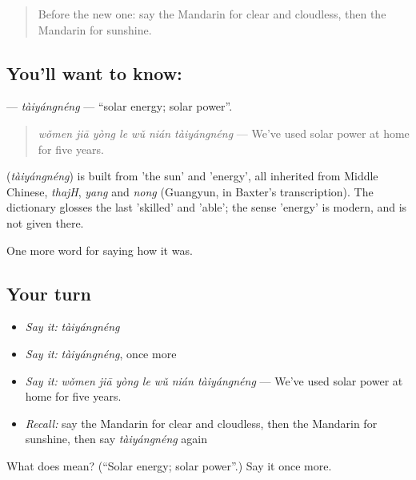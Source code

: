 \label{lesson:ZH-C518-taiyangneng}



\begin{quote}
Before the new one: say the Mandarin for clear and cloudless, then the Mandarin for sunshine.
\end{quote}

\subsection*{You'll want to know: }
\textbf{} — \emph{tàiyángnéng} — \textquotedblleft{}solar energy; solar power\textquotedblright{}.

\begin{quote}
\textbf{} \emph{wǒmen jiā yòng le wǔ nián tàiyángnéng} — We've used solar power at home for five years.
\end{quote}

\begin{cousinweb}
\textbf{} (\emph{tàiyángnéng}) is built from  'the sun' and  'energy', all inherited from Middle Chinese, \emph{thajH}, \emph{yang} and \emph{nong} (Guangyun, in Baxter's transcription). The dictionary glosses the last 'skilled' and 'able'; the sense 'energy' is modern, and is not given there.
\end{cousinweb}

\begin{grammarlens}[title={What you've built}]
One more word for saying how it was.
\end{grammarlens}

\subsection*{Your turn}
\begin{itemize}
\raggedright
  \item \emph{Say it:} \emph{tàiyángnéng}
  \item \emph{Say it:} \emph{tàiyángnéng}, once more
  \item \emph{Say it:} \emph{wǒmen jiā yòng le wǔ nián tàiyángnéng} — We've used solar power at home for five years.
  \item \emph{Recall:} say the Mandarin for clear and cloudless, then the Mandarin for sunshine, then say \emph{tàiyángnéng} again
\end{itemize}

\begin{tcolorbox}[breakable,colback=teal!4,colframe=teal!35!black,title={Before you move on}]
What does  mean? (\textquotedblleft{}Solar energy; solar power\textquotedblright{}.) Say it once more.
\end{tcolorbox}
